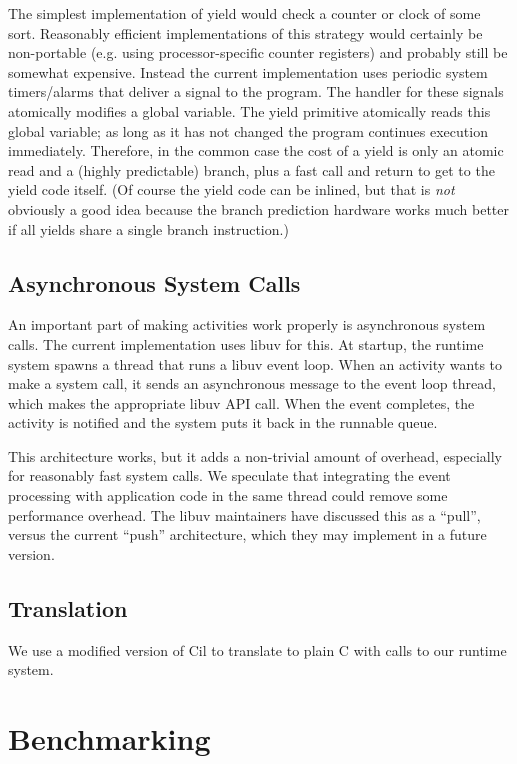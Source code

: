 \documentclass[9pt,preprint]{sigplanconf-2}
\begin{document}
The simplest implementation of yield would check a counter or clock of some sort.
Reasonably efficient implementations of this strategy would certainly be non-portable (e.g. using processor-specific counter registers) and probably still be somewhat expensive.
Instead the current \charcoal{} implementation uses periodic system timers/alarms that deliver a signal to the program.
The handler for these signals atomically modifies a global variable.
The yield primitive atomically reads this global variable; as long as it has not changed the program continues execution immediately.
Therefore, in the common case the cost of a yield is only an atomic read and a (highly predictable) branch, plus a fast call and return to get to the yield code itself.
(Of course the yield code can be inlined, but that is \emph{not} obviously a good idea because the branch prediction hardware works much better if all yields share a single branch instruction.)

\subsection{Asynchronous System Calls}

An important part of making activities work properly is asynchronous system calls.
The current \charcoal{} implementation uses libuv for this.
At startup, the runtime system spawns a thread that runs a libuv event loop.
When an activity wants to make a system call, it sends an asynchronous message to the event loop thread, which makes the appropriate libuv API call.
When the event completes, the activity is notified and the system puts it back in the runnable queue.

This architecture works, but it adds a non-trivial amount of overhead, especially for reasonably fast system calls.
We speculate that integrating the event processing with application code in the same thread could remove some performance overhead.
The libuv maintainers have discussed this as a ``pull'', versus the current ``push'' architecture, which they may implement in a future version.

\subsection{Translation}

We use a modified version of Cil \cite{Necula2002} to translate \charcoal{} to plain C with calls to our runtime system.

\section{Benchmarking}
\end{document}
